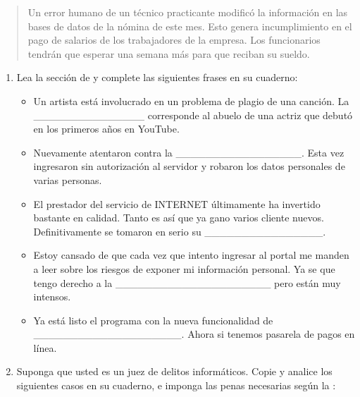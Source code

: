\documentclass[letterpaper,10pt,spanish]{sphinxmanual}
\begin{document}
\begin{quote}

\sphinxAtStartPar
{} Un error humano de un técnico practicante modificó la información en las bases de datos de la nómina de este mes. Esto genera incumplimiento en el pago de salarios de los trabajadores de la empresa. Los funcionarios tendrán que esperar una semana más para que reciban su sueldo.
\end{quote}
\begin{enumerate}
%
\setcounter{enumi}{9}
\item {} 
\sphinxAtStartPar
Lea la sección de  y complete las siguientes frases en su cuaderno:
\begin{itemize}
\item {} 
\sphinxAtStartPar
Un artista está involucrado en un problema de plagio de una canción. La \_\_\_\_\_\_\_\_\_\_\_\_\_\_\_ corresponde al abuelo de una actriz que debutó en los primeros años en YouTube.

\item {} 
\sphinxAtStartPar
Nuevamente atentaron contra la \_\_\_\_\_\_\_\_\_\_\_\_\_\_\_\_\_. Esta vez ingresaron sin autorización al servidor y robaron los datos personales de varias personas.

\item {} 
\sphinxAtStartPar
El prestador del servicio de INTERNET últimamente ha invertido bastante en calidad. Tanto es así que ya gano varios cliente nuevos. Definitivamente se tomaron en serio su \_\_\_\_\_\_\_\_\_\_\_\_\_\_\_\_.

\item {} 
\sphinxAtStartPar
Estoy cansado de que cada vez que intento ingresar al portal me manden a leer sobre los riesgos de exponer mi información personal. Ya se que tengo derecho a la \_\_\_\_\_\_\_\_\_\_\_\_\_\_\_\_\_\_\_\_\_ pero están muy intensos.

\item {} 
\sphinxAtStartPar
Ya está listo el programa con la nueva funcionalidad de \_\_\_\_\_\_\_\_\_\_\_\_\_\_\_\_\_\_\_\_. Ahora si tenemos pasarela de pagos en línea.

\end{itemize}

\item {} 
\sphinxAtStartPar
Suponga que usted es un juez de delitos informáticos. Copie y analice los siguientes casos en su cuaderno, e imponga las penas necesarias según la :
\begin{quote}


\end{quote}
\end{enumerate}
\end{document}
